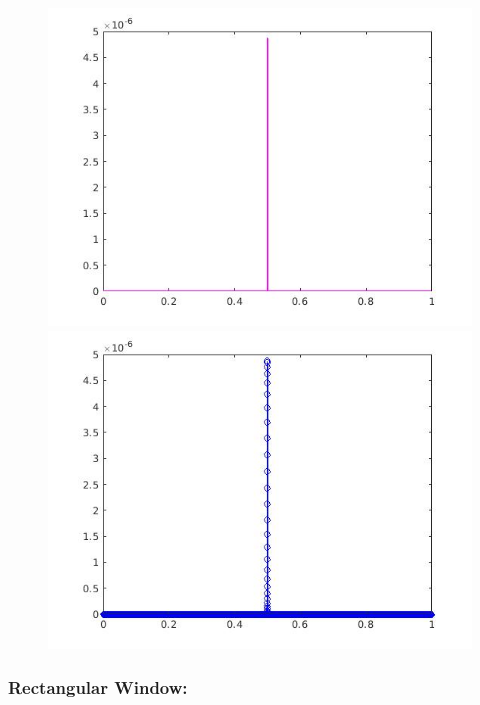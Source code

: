 \documentclass[a4paper,11pt]{article}
\begin{document}
\begin{figure}[!hp]
\centering
\begin{minipage}{.5\textwidth}
  \centering
  \includegraphics[width=1\linewidth]{images/lab2_10.jpg}
\end{minipage}%
\begin{minipage}{.5\textwidth}
  \centering
  \includegraphics[width=1\linewidth]{images/lab2_11.jpg}
\end{minipage}
\end{figure}

\subsubsection{Rectangular Window:}
\end{document}
